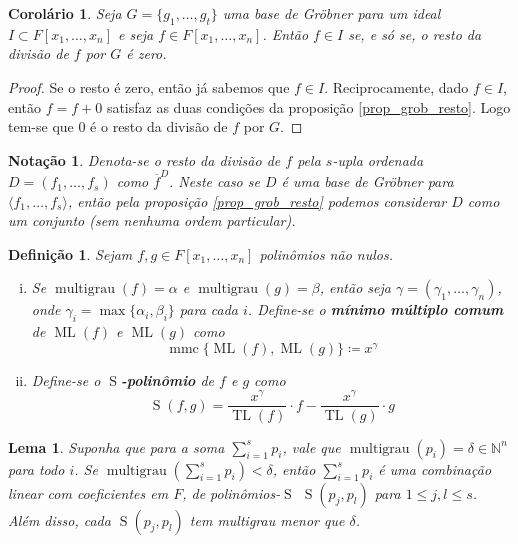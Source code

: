 \documentclass[12pt,a4paper]{report}
\newcommand{\N}{\mathbb{N}}
\newtheorem{definition}[theorem]{Definição}
\newtheorem{lemma}[theorem]{Lema}
\newtheorem{corollary}[theorem]{Corolário}
\newtheorem*{notation}{Notação}
\numberwithin{theorem}{chapter}
\DeclareMathOperator{\multigrau}{multigrau}
\DeclareMathOperator{\ML}{ML}
\DeclareMathOperator{\TL}{TL}
\DeclareMathOperator{\mmc}{mmc}
\DeclareMathOperator{\Sp}{S}
\begin{document}
\begin{corollary}\label{corol_2}
  Seja \(G = \{g_1,\ldots,g_t\}\) uma base de Gröbner para um ideal
  \(I \subset F[x_1,\ldots,x_n]\) e seja \(f \in F[x_1,\ldots,x_n]\).
  Então \(f \in I\) se, e só se, o resto da divisão de \(f\) por \(G\)
  é zero.
\end{corollary}

\begin{proof}
  Se o resto é zero, então já sabemos que \(f \in I\).
  Reciprocamente, dado \(f \in I\), então \(f = f + 0\) satisfaz as
  duas condições da proposição \ref{prop_grob_resto}.  Logo tem-se que
  \(0\) é o resto da divisão de \(f\) por \(G\).
\end{proof}

\begin{notation}
  Denota-se o resto da divisão de \(f\) pela \(s\)-upla ordenada \(D =
  (f_1,\ldots,f_s)\) como \(\overline{f}^D\).  Neste caso se \(D\) é
  uma base de Gröbner para \(\langle f_1,\ldots,f_s \rangle\), então
  pela proposição \ref{prop_grob_resto} podemos considerar \(D\) como
  um conjunto (sem nenhuma ordem particular).
\end{notation}

\begin{definition}
  Sejam \(f, g \in F[x_1,\ldots,x_n]\) polinômios não nulos.
  \begin{enumerate}[(i)]
  \item Se \(\multigrau(f) = \alpha\) e \(\multigrau(g) = \beta\),
    então seja \(\gamma = (\gamma_1,\ldots,\gamma_n)\), onde
    \(\gamma_i = \max\{\alpha_i,\beta_i\}\) para cada \(i\).
    Define-se o \textbf{mínimo múltiplo comum} de \(\ML(f)\) e
    \(\ML(g)\) como \[\mmc\{\ML(f),\ML(g)\} \coloneqq x^\gamma\]

  \item Define-se o \textbf{\(\Sp\)-polinômio} de \(f\) e \(g\) como
    \[\Sp(f,g) = \frac{x^\gamma}{\TL(f)}\cdot f -
    \frac{x^\gamma}{\TL(g)}\cdot g\]
  \end{enumerate}
\end{definition}

\begin{lemma}\label{lema_5}
  Suponha que para a soma \(\sum_{i=1}^s{p_i}\), vale que
  \(\multigrau(p_i) = \delta \in \N^n\) para todo \(i\).  Se
  \(\multigrau\left(\sum_{i=1}^s{p_i}\right) < \delta\), então
  \(\sum_{i=1}^sp_i\) é uma combinação linear com coeficientes em
  \(F\), de polinômios-\(\Sp\) \(\Sp(p_j,p_l)\) para \(1 \leq j,l \leq
  s\).  Além disso, cada \(\Sp(p_j,p_l)\) tem multigrau menor que
  \(\delta\).
\end{lemma}
\end{document}
